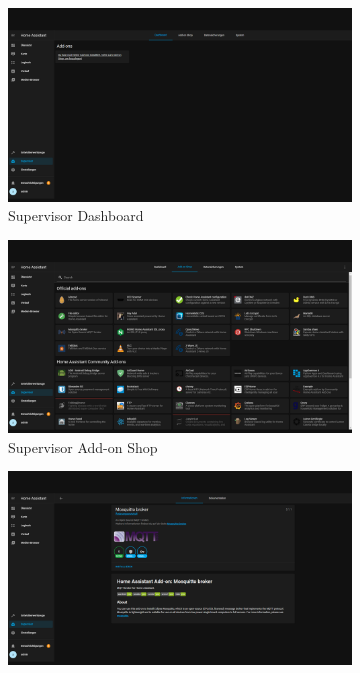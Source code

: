 \begin{figure}[H]
    \begin{subfigure}{.5\linewidth}
        \includegraphics[width=1\textwidth]{img/HA6.png}
        \caption{Supervisor Dashboard}
        \label{fig:ha5}
    \end{subfigure}
    \begin{subfigure}{.5\linewidth}
        \includegraphics[width=1\textwidth]{img/HA7.png}
        \caption{Supervisor Add-on Shop}
        \label{fig:ha6}
    \end{subfigure}
    \begin{subfigure}{.5\linewidth}
        \includegraphics[width=1\textwidth]{img/HA8.png}

\end{subfigure}
\end{figure}
